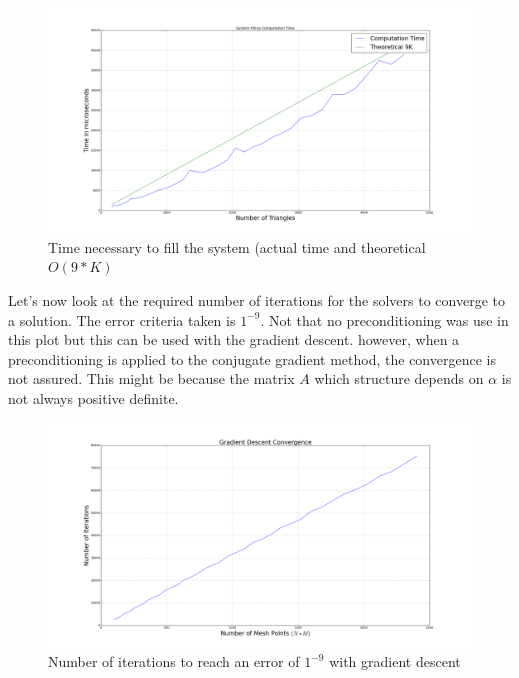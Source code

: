 \documentclass[a4paper]{report}
\begin{document}
\begin{figure}[H]
\begin{center}
\includegraphics[scale=0.20]{filling_time.png}\caption{Time necessary to fill the system (actual time and theoretical $O(9*K)$}
\end{center}
\end{figure}

Let's now look at the required number of iterations for the solvers to converge to a solution. The error criteria taken is $1^{-9}$. Not that no preconditioning was use in this plot but this can be used with the gradient descent. however, when a preconditioning is applied to the conjugate gradient method, the convergence is not assured. This might be because the matrix $A$ which structure depends on $\alpha$ is not always positive definite.
\begin{figure}[H]
\begin{center}
\includegraphics[scale=0.20]{GD_iter.png}\caption{Number of iterations to reach an error of $1^{-9}$ with gradient descent}
\end{center}
\end{figure}
\end{document}
